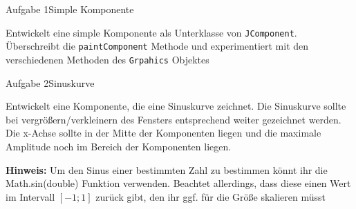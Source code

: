 \begin{frame}{Aufgabe 1}{Simple Komponente}
\begin{alertblock}{}
Entwickelt eine simple Komponente als Unterklasse von \texttt{JComponent}. Überschreibt die \texttt{paintComponent} Methode und experimentiert mit den verschiedenen Methoden des \texttt{Grpahics} Objektes
\end{alertblock}
\end{frame}

\begin{frame}{Aufgabe 2}{Sinuskurve}
\begin{alertblock}{}
Entwickelt eine Komponente, die eine Sinuskurve zeichnet. Die Sinuskurve sollte bei vergrößern/verkleinern des Fensters entsprechend weiter gezeichnet werden. Die x-Achse sollte in der Mitte der Komponenten liegen und die maximale Amplitude noch im Bereich
der Komponenten liegen.

\textbf{Hinweis:} Um den Sinus einer bestimmten Zahl zu bestimmen könnt ihr die Math.sin(double) Funktion verwenden. Beachtet allerdings, dass diese einen Wert im Intervall $[-1;1]$ zurück gibt, den ihr ggf. für die Größe skalieren müsst
\end{alertblock}
\end{frame}